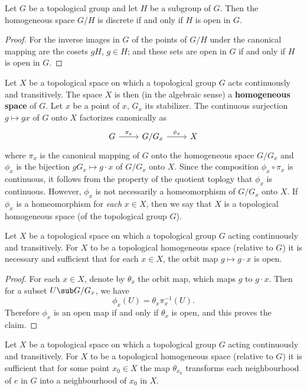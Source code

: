 \begin{proposition}\label{topological group coset space discrete iff}
Let $G$ be a topological group and let $H$ be a subgroup of $G$. Then the homogeneous space $G/H$ is discrete if and only if $H$ is open in $G$.
\end{proposition}
\begin{proof}
For the inverse images in $G$ of the points of $G/H$ under the canonical mapping are the cosets $gH$, $g\in H$; and these sets are open in $G$ if and only if $H$ is open in $G$.
\end{proof}
Let $X$ be a topological space on which a topological group $G$ acts continuously and transitively. The space $X$ is then (in the algebraic sense) a \textbf{homogeneous space} of $G$. Let $x$ be a point of $x$, $G_x$ its stabilizer. The continuous surjection $g\mapsto gx$ of $G$ onto $X$ factorizes canonically as
\[\begin{tikzcd}
G\ar[r,"\pi_x"]&G/G_x\ar[r,"\phi_x"]&X
\end{tikzcd}\]
where $\pi_x$ is the canonical mapping of $G$ onto the homogeneous space $G/G_x$ and $\phi_x$ is the bijection $gG_x\mapsto g\cdot x$ of $G/G_x$ onto $X$. Since the composition $\phi_x\circ\pi_x$ is continuous, it follows from the property of the quotient toplogy that $\phi_x$ is continuous. However, $\phi_x$ is not necessarily a homeomorphism of $G/G_x$ onto $X$. If $\phi_x$ is a homeomorphism for \textit{each} $x\in X$, then we say that $X$ is a topological homogeneous space (of the topological group $G$).
\begin{proposition}\label{topological group homogeneous space is topological iff}
Let $X$ be a topological space on which a topological group $G$ acting continuously and transitively. For $X$ to be a topological homogeneous space (relative to $G$) it is necessary and sufficient that for each $x\in X$, the orbit map $g\mapsto g\cdot x$ is open.
\end{proposition}
\begin{proof}
For each $x\in X$, denote by $\theta_x$ the orbit map, which maps $g$ to $g\cdot x$. Then for a subset $U\sub G/G_x$, we have
\[\phi_x(U)=\theta_x\pi_x^{-1}(U).\]
Therefore $\phi_x$ is an open map if and only if $\theta_x$ is open, and this proves the claim.
\end{proof}
\begin{proposition}\label{topological group homogeneous space is topological if}
Let $X$ be a topological space on which a topological group $G$ acting continuously and transitively. For $X$ to be a topological homogeneous space (relative to $G$) it is sufficient that for some point $x_0\in X$ the map $\theta_{x_0}$ transforms each neighbourhood of $e$ in $G$ into a neighbourhood of $x_0$ in $X$.
\end{proposition}
